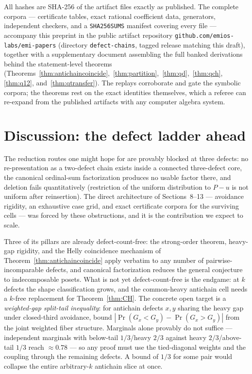 \documentclass[11pt]{article}
\theoremstyle{definition}
\theoremstyle{remark}
\newcommand{\pr}{\operatorname{Pr}}
\begin{document}
All hashes are SHA-256 of the artifact files exactly as published. The complete corpora
--- certificate tables, exact rational coefficient data, generators, independent
checkers, and a \texttt{SHA256SUMS} manifest covering every file --- accompany this
preprint in the public artifact repository
\texttt{github.com/emios-labs/emi-papers} (directory \texttt{defect-chains}, tagged
release matching this draft), together with a supplementary document
assembling the full banked derivations behind the statement-level theorems
(Theorems~\ref{thm:antichaincoincide},~\ref{thm:partition},~\ref{thm:qd},~\ref{thm:qch},
\ref{thm:q12}, and~\ref{thm:qtransfer}). The replays corroborate and gate the symbolic
corpora; the theorems rest on the exact identities themselves, which a referee can
re-expand from the published artifacts with any computer algebra system.

\section{Discussion: the defect ladder ahead}\label{sec:discussion}
The reduction routes one might hope for are provably blocked at three defects: no
re-presentation as a two-defect chain exists inside a connected three-defect core, the
canonical ordinal-sum factorization produces no usable factor there, and deletion fails
quantitatively (restriction of the uniform distribution to $P-u$ is not uniform after
reinsertion). The direct architecture of Sections~8--13 --- avoidance rigidity, an
exhaustive case grid, and exact certificate corpora for the surviving cells --- was
forced by these obstructions, and it is the contribution we expect to scale.

Three of its pillars are already defect-count-free: the strong-order theorem, heavy-gap
rigidity, and the Helly coincidence mechanism of Theorem~\ref{thm:antichaincoincide}
apply verbatim to any number of pairwise-incomparable defects, and canonical
factorization reduces the general conjecture to indecomposable posets. What is not yet
defect-count-free is the endgame: at $k$ defects the shape classification grows, and the
common-heavy antichain cell needs a $k$-free replacement for
Theorem~\ref{thm:CH}. The concrete open target is a \emph{weighted-gap split-tail
inequality}: for antichain defects $x,y$ sharing the heavy gap under closed-third
avoidance, bound $|\pr(G_x<G_y)-\pr(G_x>G_y)|$ from the joint weighted fiber structure.
Marginals alone provably do not suffice --- independent marginals with below-tail
$1/3$/heavy $2/3$ against heavy $2/3$/above-tail $1/3$ reach $\approx0.78$ --- so any
proof must use the tied-diagonal weights and the coupling through the remaining defects.
A bound of $1/3$ for some pair would collapse the entire arbitrary-$k$ antichain slice
at once.
\end{document}
